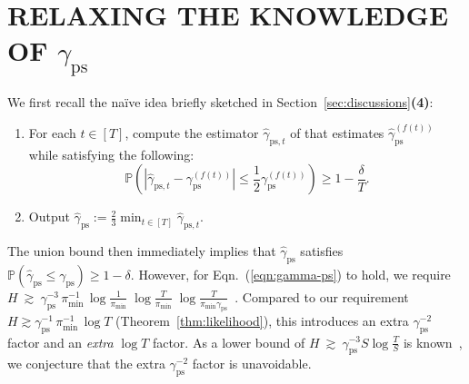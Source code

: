 \documentclass[twoside]{article}
\def\eqref#1{(\ref{#1})}
\theoremstyle{plain}
\newcommand{\ps}{\mathrm{ps}}
\begin{document}
\newpage
\section{\texorpdfstring{RELAXING THE KNOWLEDGE OF $\gamma_\ps$}{RELAXING THE KNOWLEDGE OF PSEUDO-SPECTRAL GAP}}
\label{app:gamma-ps}
We first recall the na\"{i}ve idea briefly sketched in Section~\ref{sec:discussions}\textbf{(4)}:
\begin{enumerate}
    \item For each $t \in [T]$, compute the estimator $\hat{\gamma}_{\ps,t}$ of \citet{wolfer2024mixing} that estimates $\hat{\gamma}_\ps^{(f(t))}$ while satisfying the following:
    \begin{equation}
    \label{eqn:gamma-ps}
        \mathbb{P}\left(\left|\hat{\gamma}_{\ps,t}-\gamma_\ps^{(f(t))}\right| \leq \frac{1}{2} \gamma_\ps^{(f(t))}\right) \geq  1 - \frac{\delta}{T}.
    \end{equation}
    \item Output $\hat{\gamma}_\ps := \frac{2}{3} \min_{t \in [T]} \hat{\gamma}_{\ps,t}$.
\end{enumerate}

The union bound then immediately implies that $\hat{\gamma}_\ps$ satisfies $\mathbb{P}(\hat{\gamma}_\ps \le \gamma_\ps) \geq 1 - \delta$.
However, for Eqn.~\eqref{eqn:gamma-ps} to hold, we require 
$H \ \gtrsim\ \gamma_\ps^{-3}\,\pi_{\min}^{-1}\,\log\!\frac{1}{\pi_{\min}}\;\log\!\frac{T}{\pi_{\min}}\;\log\!\frac{T}{\pi_{\min}\gamma_\ps}$~\citep[Theorem~1]{wolfer2024mixing}.
Compared to our requirement $H \gtrsim \gamma_\ps^{-1}\,\pi_{\min}^{-1}\,\log T$ (Theorem~\ref{thm:likelihood}), this introduces an extra $\gamma_\ps^{-2}$ factor and an \emph{extra} $\log T$ factor.
As a lower bound of $H \ \gtrsim\ \gamma_\ps^{-3} S \log\!\frac{T}{S}$ is known~\citep[Theorem~4]{wolfer2019mixing}, we conjecture that the extra $\gamma_\ps^{-2}$ factor is unavoidable.
\end{document}
